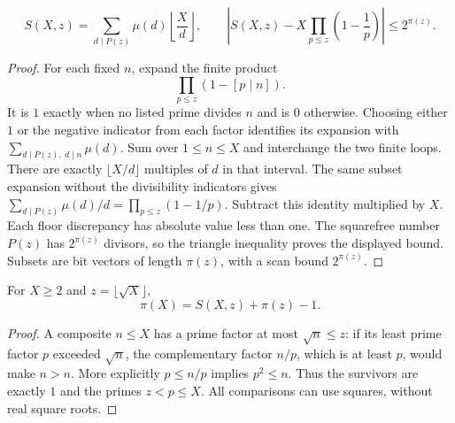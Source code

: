 \begin{theorem}\label{an:sieve}
\[
 S(X,z)=\sum_{d\mid P(z)}\mu(d)\left\lfloor\frac Xd\right\rfloor,
 \qquad
 \left|S(X,z)-X\prod_{p\le z}\left(1-\frac1p\right)\right|
 \le 2^{\pi(z)}.
\]
\end{theorem}
\begin{proof}
For each fixed $n$, expand the finite product
\[
 \prod_{p\le z}(1-[p\mid n]).
\]
It is $1$ exactly when no listed prime divides $n$ and is $0$ otherwise. Choosing either $1$ or the negative indicator from each factor identifies its expansion with $\sum_{d\mid P(z),\ d\mid n}\mu(d)$. Sum over $1\le n\le X$ and interchange the two finite loops. There are exactly $\lfloor X/d\rfloor$ multiples of $d$ in that interval. The same subset expansion without the divisibility indicators gives $\sum_{d\mid P(z)}\mu(d)/d=\prod_{p\le z}(1-1/p)$. Subtract this identity multiplied by $X$. Each floor discrepancy has absolute value less than one. The squarefree number $P(z)$ has $2^{\pi(z)}$ divisors, so the triangle inequality proves the displayed bound. Subsets are bit vectors of length $\pi(z)$, with a scan bound $2^{\pi(z)}$.
\end{proof}

\begin{corollary}\label{an:sievepi}
For $X\ge2$ and $z=\lfloor\sqrt X\rfloor$,
\[
 \pi(X)=S(X,z)+\pi(z)-1.
\]
\end{corollary}
\begin{proof}
A composite $n\le X$ has a prime factor at most $\sqrt n\le z$: if its least prime factor $p$ exceeded $\sqrt n$, the complementary factor $n/p$, which is at least $p$, would make $n>n$. More explicitly $p\le n/p$ implies $p^2\le n$. Thus the survivors are exactly $1$ and the primes $z<p\le X$. All comparisons can use squares, without real square roots.
\end{proof}

